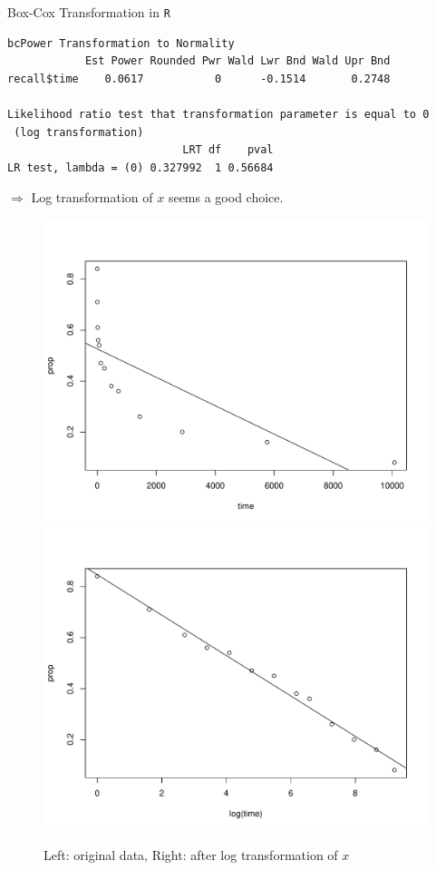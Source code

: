 \documentclass{beamer}
\begin{document}
\begin{frame}[fragile]{Box-Cox Transformation in \texttt{R}}

\begin{footnotesize}
\begin{verbatim}
bcPower Transformation to Normality 
            Est Power Rounded Pwr Wald Lwr Bnd Wald Upr Bnd
recall$time    0.0617           0      -0.1514       0.2748

Likelihood ratio test that transformation parameter is equal to 0
 (log transformation)
                           LRT df    pval
LR test, lambda = (0) 0.327992  1 0.56684
\end{verbatim}
\end{footnotesize}
\pause$\Rightarrow$ Log transformation of $x$ seems a good choice. 
\pause \begin{figure}
    \centering
\includegraphics[width=.5\textwidth]{plots/recall_baseline.pdf}\includegraphics[width=.5\textwidth]{plots/recall_bc.pdf}
    \caption{Left: original data, Right: after log transformation of $x$}
\end{figure}
\end{frame}
\end{document}
